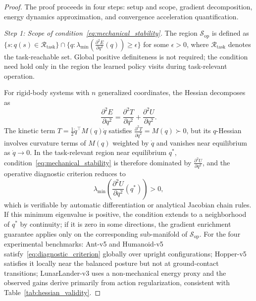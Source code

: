 \documentclass[journal]{IEEEtran}
\begin{document}
	\begin{proof}
		The proof proceeds in four steps: setup and scope, gradient decomposition, energy dynamics approximation, and convergence acceleration quantification.
		
		\textit{Step 1: Scope of condition~\eqref{eq:mechanical_stability}.}
		The region $\mathcal{S}_{\text{op}}$ is defined as $\{s : q(s)\in\mathcal{R}_{\text{task}}\} \cap \{q : \lambda_{\min}(\frac{\partial^2 E}{\partial q^2}(q))\geq\epsilon\}$ for some $\epsilon>0$, where $\mathcal{R}_{\text{task}}$ denotes the task-reachable set. Global positive definiteness is not required; the condition need hold only in the region the learned policy visits during task-relevant operation.
		
		For rigid-body systems with $n$ generalized coordinates, the Hessian decomposes as
		\begin{equation}
			\frac{\partial^2 E}{\partial q^2} = \frac{\partial^2 T}{\partial q^2} + \frac{\partial^2 U}{\partial q^2}.
		\end{equation}
		The kinetic term $T=\frac{1}{2}\dot{q}^\top M(q)\dot{q}$ satisfies $\frac{\partial^2 T}{\partial\dot{q}^2}=M(q)\succ 0$, but its $q$-Hessian involves curvature terms of $M(q)$ weighted by $\dot{q}$ and vanishes near equilibrium as $\dot{q}\to 0$. In the task-relevant region near equilibrium $q^*$, condition~\eqref{eq:mechanical_stability} is therefore dominated by $\frac{\partial^2 U}{\partial q^2}$, and the operative diagnostic criterion reduces to
		\begin{equation}
			\lambda_{\min}\!\left(\frac{\partial^2 U}{\partial q^2}(q^*)\right) > 0,
			\label{eq:diagnostic_criterion}
		\end{equation}
		which is verifiable by automatic differentiation or analytical Jacobian chain rules. If this minimum eigenvalue is positive, the condition extends to a neighborhood of $q^*$ by continuity; if it is zero in some directions, the gradient enrichment guarantee applies only on the corresponding sub-manifold of $\mathcal{S}_{\text{op}}$. For the four experimental benchmarks: Ant-v5 and Humanoid-v5 satisfy~\eqref{eq:diagnostic_criterion} globally over upright configurations; Hopper-v5 satisfies it locally near the balanced posture but not at ground-contact transitions; LunarLander-v3 uses a non-mechanical energy proxy and the observed gains derive primarily from action regularization, consistent with Table~\ref{tab:hessian_validity}.
		

\end{proof}
\end{document}
